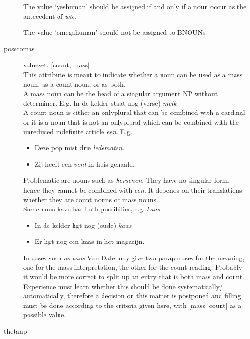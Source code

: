 \begin{description}
The value `yeshuman' should be assigned if and only if  a noun occur as the 
antecedent of {\em wie}.

The value `omegahuman' should not be assigned to BNOUNs.\\

\newpage
\item 
[posscomas]

valueset: [count, mass]\\

This attribute is meant to indicate whether a noun can be used as
a mass noun, as a count noun, or as both.\\

A mass noun can be the head of a singular argument NP without determiner.
E.g. In de kelder staat nog (verse) {\em melk}.\\

A count noun is either an onlyplural that can be combined with a cardinal
or it is a noun that is not an onlyplural which
can be combined with the unreduced indefinite article {\em een}.
E.g. 
\begin{itemize}
  \item
Deze pop mist drie {\em ledematen}.
  \item
Zij heeft een {\em vent} in huis gehaald.
\end{itemize}


Problematic are nouns such as {\em hersenen}. They have no singular form, hence
they cannot be combined with {\em een}. It depends on their 
translations whether they are count nouns or mass nouns.\\


Some nous have has both possibilies, e.g. {\em kaas}.
\begin{itemize}
  \item
In de kelder ligt  nog (oude) {\em kaas} 
  \item
Er ligt nog een {kaas} in het magazijn.
\end{itemize}

In cases such as {\em kaas} Van Dale may 
give two paraphrases for the meaning,
one for the mass interpretation, the other for the count reading.
Probably it would be more correct to split up an entry that is both mass
and count. Experience must learn whether this should be done systematically/
automatically, therefore a decision on this matter is postponed and filling 
must be done according to the criteria given here, with [mass, count]
as a possible value.


\newpage
\item 
[thetanp]\mbox{}


\end{description}
